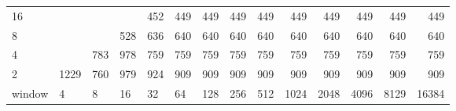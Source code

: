\begin{table}[h]
{\begin{tabular}{lrrrrrrrrrrrrr}
			\multicolumn{1}{|l|}{16} &  &  &  & \cellcolor[HTML]{E69900}452 & \cellcolor[HTML]{E69900}449 & \cellcolor[HTML]{E69900}449 & \cellcolor[HTML]{E69900}449 & \cellcolor[HTML]{E69900}449 & \cellcolor[HTML]{E69900}449 & \cellcolor[HTML]{E69900}449 & \cellcolor[HTML]{E69900}449 & \cellcolor[HTML]{E69900}449 & \cellcolor[HTML]{E69900}449 \\ \cline{1-1}
			\multicolumn{1}{|l|}{8} &  &  & \cellcolor[HTML]{E69900}528 & \cellcolor[HTML]{E60000}636 & \cellcolor[HTML]{E60000}640 & \cellcolor[HTML]{E60000}640 & \cellcolor[HTML]{E60000}640 & \cellcolor[HTML]{E60000}640 & \cellcolor[HTML]{E60000}640 & \cellcolor[HTML]{E60000}640 & \cellcolor[HTML]{E60000}640 & \cellcolor[HTML]{E60000}640 & \cellcolor[HTML]{E60000}640 \\ \cline{1-1}
			\multicolumn{1}{|l|}{4} &  & \cellcolor[HTML]{E60000}783 & \cellcolor[HTML]{9900E6}978 & \cellcolor[HTML]{E60000}759 & \cellcolor[HTML]{E60000}759 & \cellcolor[HTML]{E60000}759 & \cellcolor[HTML]{E60000}759 & \cellcolor[HTML]{E60000}759 & \cellcolor[HTML]{E60000}759 & \cellcolor[HTML]{E60000}759 & \cellcolor[HTML]{E60000}759 & \cellcolor[HTML]{E60000}759 & \cellcolor[HTML]{E60000}759 \\ \cline{1-1}
			\multicolumn{1}{|l|}{2} & \cellcolor[HTML]{4C00E6}1229 & \cellcolor[HTML]{E60000}760 & \cellcolor[HTML]{9900E6}979 & \cellcolor[HTML]{9900E6}924 & \cellcolor[HTML]{9900E6}909 & \cellcolor[HTML]{9900E6}909 & \cellcolor[HTML]{9900E6}909 & \cellcolor[HTML]{9900E6}909 & \cellcolor[HTML]{9900E6}909 & \cellcolor[HTML]{9900E6}909 & \cellcolor[HTML]{9900E6}909 & \cellcolor[HTML]{9900E6}909 & \cellcolor[HTML]{9900E6}909 \\ \hline
			\multicolumn{1}{l|}{window} & \multicolumn{1}{l|}{4} & \multicolumn{1}{l|}{8} & \multicolumn{1}{l|}{16} & \multicolumn{1}{l|}{32} & \multicolumn{1}{l|}{64} & \multicolumn{1}{l|}{128} & \multicolumn{1}{l|}{256} & \multicolumn{1}{l|}{512} & \multicolumn{1}{l|}{1024} & \multicolumn{1}{l|}{2048} & \multicolumn{1}{l|}{4096} & \multicolumn{1}{l|}{8129} & \multicolumn{1}{l|}{16384} \\ \cline{2-14} 
		\end{tabular}
	}
\end{table}

